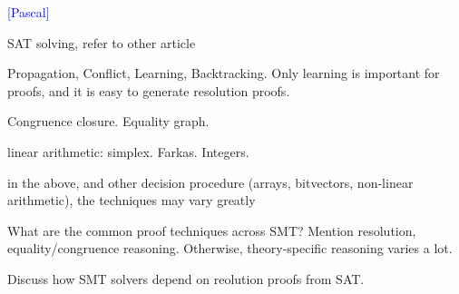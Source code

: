 \documentclass{llncs}
\newcommand{\Note}[1]{\textcolor{blue}{[#1]}}
\begin{document}
\Note{Pascal}

SAT solving, refer to other article

Propagation, Conflict, Learning, Backtracking.  Only learning is important for proofs, and it is easy to generate resolution proofs.

Congruence closure.  Equality graph.

linear arithmetic: simplex.  Farkas.  Integers.

in the above, and other decision procedure (arrays, bitvectors, non-linear arithmetic), the techniques may vary greatly

What are the common proof techniques across SMT?  Mention resolution,
equality/congruence reasoning.  Otherwise, theory-specific reasoning varies a lot.





Discuss how SMT solvers depend on reolution proofs from SAT.




\end{document}
